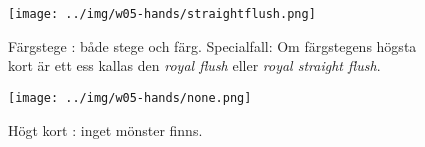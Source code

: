 \begin{figure}[H]
 \begin{minipage}[c]{\CardWidth}
  \texttt{[image: ../img/w05-hands/straightflush.png]}
 \end{minipage}\hfill
 \begin{minipage}[c]{\CardCaptionWidth}
  \caption{Färgstege : både stege och färg. Specialfall: Om färgstegens högsta kort är ett ess kallas den \textit{royal flush} eller \textit{royal straight flush}.}
 \end{minipage}
\end{figure}

\begin{figure}[H]
 \begin{minipage}[c]{\CardWidth}
  \texttt{[image: ../img/w05-hands/none.png]}
 \end{minipage}\hfill
 \begin{minipage}[c]{\CardCaptionWidth}
  \caption{Högt kort : inget mönster finns.}
 \label{lab:shuffle:last-picture}
  \end{minipage}
\end{figure}
